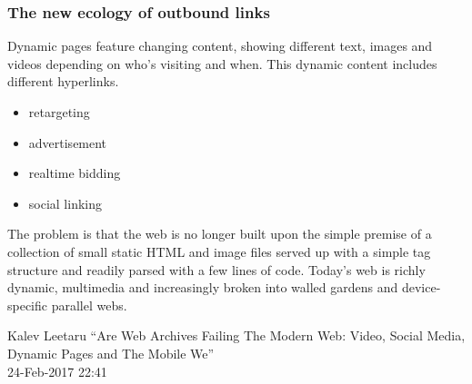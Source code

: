 \documentclass[aspectratio=169]{beamer}
\begin{document}
\begin{frame}
\frametitle{The new ecology of outbound links}
Dynamic pages feature changing content, showing different text, images and videos depending on who's visiting and when. This dynamic content includes different hyperlinks.\\\vspace{0.5cm}
%
\begin{itemize}
\item{retargeting}
\item{advertisement}
\item{realtime bidding}
\item{social linking}
\end{itemize}
%
\end{frame}

\begin{frame}
%
\epigraph{The problem is that the web is no longer built upon the simple premise of a collection of small static HTML and image files served up with a simple tag structure and readily parsed with a few lines of code. Today’s web is richly dynamic, multimedia and increasingly broken into walled gardens and device-specific parallel webs.}{Kalev Leetaru ``Are Web Archives Failing The Modern Web: Video, Social Media, Dynamic Pages and The Mobile We''\\ 24-Feb-2017 22:41}
%
\end{frame}
\end{document}
